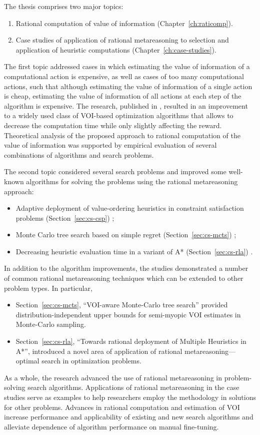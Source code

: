The thesis comprises two major topics:
\begin {enumerate}
\item Rational computation of value of information (Chapter~\ref{ch:raticomp}).
\item Case studies of application of rational metareasoning to
  selection and application of heuristic computations (Chapter~\ref{ch:case-studies}).
\end {enumerate}

The first topic addressed cases in which estimating the value
of information of a computational action is expensive, as well as
cases of too many computational actions, such that although
estimating the value of information of a single action is cheap,
estimating the value of information of all actions at each step of the
algorithm is expensive. The research, published in
\cite{TolpinShimony.raticomp}, resulted in an improvement to a widely
used class of VOI-based optimization algorithms that allows to decrease the
computation time while only slightly affecting the reward. Theoretical
analysis of the proposed approach to rational computation of the
value of information was supported by empirical evaluation of several
combinations of algorithms and search problems.

The second topic considered several search problems and improved some
well-known algorithms for solving the problems using the rational
metareasoning approach:
\begin {itemize}
\item Adaptive deployment of value-ordering heuristics in constraint
  satisfaction problems (Section~\ref{sec:cs-csp}) \cite{TolpinShimony.csp};
\item Monte Carlo tree search based on simple regret
  (Section~\ref{sec:cs-mcts}) \cite{TolpinShimony.mcts,HayRussellTolpinShimony.selecting};
\item Decreasing heuristic evaluation time in a variant of A*
  (Section~\ref{sec:cs-rla}) \cite{TolpinEtAl.rla}. 
\end {itemize}
In addition to the algorithm improvements, the studies demonstrated a
number of common rational metareasoning techniques which can be 
extended to other problem types. In particular,
\begin{itemize}
\item Section~\ref{sec:cs-mcts}, ``VOI-aware Monte-Carlo tree search''
provided distribution-independent upper bounds for semi-myopic VOI
estimates in Monte-Carlo sampling.
\item Section~\ref{sec:cs-rla}, ``Towards rational deployment of Multiple
Heuristics in A*'', introduced a novel area of application of rational
metareasoning---optimal search in optimization problems.
\end{itemize}

As a whole, the research advanced the use of rational
metareasoning in problem-solving search algorithms. Applications of
rational metareasoning in the case studies serve as examples
to help researchers employ the methodology in solutions for other
problems. Advances in rational computation and estimation of VOI increase
performance and applicability of existing and new search algorithms
and alleviate dependence of algorithm performance on manual
fine-tuning.
